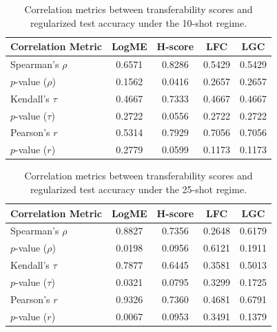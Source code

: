 \begin{table}[htbp]
\centering
\caption{Correlation metrics between transferability scores and regularized test accuracy under the 10-shot regime.}
\label{tab:correlation_metrics_10_shot}
\begin{tabular}{lcccc}
\hline
\textbf{Correlation Metric} & \textbf{LogME} & \textbf{H-score} & \textbf{LFC} & \textbf{LGC} \\ \hline
Spearman's $\rho$ & 0.6571 & 0.8286 & 0.5429 & 0.5429 \\
$p$-value ($\rho$) & 0.1562 & 0.0416 & 0.2657 & 0.2657 \\
Kendall's $\tau$ & 0.4667 & 0.7333 & 0.4667 & 0.4667 \\
$p$-value ($\tau$) & 0.2722 & 0.0556 & 0.2722 & 0.2722 \\
Pearson's $r$ & 0.5314 & 0.7929 & 0.7056 & 0.7056 \\
$p$-value ($r$) & 0.2779 & 0.0599 & 0.1173 & 0.1173 \\
\hline
\end{tabular}
\end{table}


\begin{table}[htbp]
\centering
\caption{Correlation metrics between transferability scores and regularized test accuracy under the 25-shot regime.}
\label{tab:correlation_metrics_25_shot}
\begin{tabular}{lcccc}
\hline
\textbf{Correlation Metric} & \textbf{LogME} & \textbf{H-score} & \textbf{LFC} & \textbf{LGC} \\ \hline
Spearman's $\rho$ & 0.8827 & 0.7356 & 0.2648 & 0.6179 \\
$p$-value ($\rho$) & 0.0198 & 0.0956 & 0.6121 & 0.1911 \\
Kendall's $\tau$ & 0.7877 & 0.6445 & 0.3581 & 0.5013 \\
$p$-value ($\tau$) & 0.0321 & 0.0795 & 0.3299 & 0.1725 \\
Pearson's $r$ & 0.9326 & 0.7360 & 0.4681 & 0.6791 \\
$p$-value ($r$) & 0.0067 & 0.0953 & 0.3491 & 0.1379 \\
\hline
\end{tabular}
\end{table}

